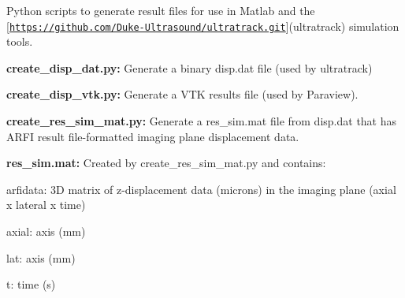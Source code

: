 Python scripts to generate result files for use in Matlab and the \mbox{[}\href{https://github.com/Duke-Ultrasound/ultratrack.git}{\tt https\+://github.\+com/\+Duke-\/\+Ultrasound/ultratrack.\+git}\mbox{]}(ultratrack) simulation tools.


\begin{DoxyItemize}
\item {\bfseries create\+\_\+disp\+\_\+dat.\+py\+:} Generate a binary {\ttfamily disp.\+dat} file (used by {\ttfamily ultratrack})
\item {\bfseries create\+\_\+disp\+\_\+vtk.\+py\+:} Generate a V\+T\+K results file (used by Paraview).
\item {\bfseries create\+\_\+res\+\_\+sim\+\_\+mat.\+py\+:} Generate a {\ttfamily res\+\_\+sim.\+mat} file from {\ttfamily disp.\+dat} that has A\+R\+F\+I result file-\/formatted imaging plane displacement data.
\item {\bfseries res\+\_\+sim.\+mat\+:} Created by {\ttfamily create\+\_\+res\+\_\+sim\+\_\+mat.\+py} and contains\+:
\begin{DoxyItemize}
\item {\ttfamily arfidata}\+: 3\+D matrix of z-\/displacement data (microns) in the imaging plane (axial x lateral x time)
\item {\ttfamily axial}\+: axis (mm)
\item {\ttfamily lat}\+: axis (mm)
\item {\ttfamily t}\+: time (s) 
\end{DoxyItemize}
\end{DoxyItemize}
